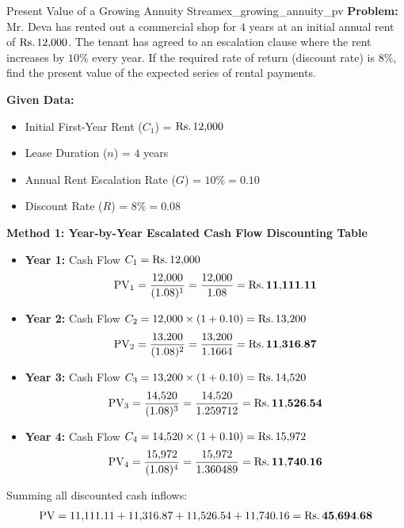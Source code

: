 \begin{example}{Present Value of a Growing Annuity Stream}{ex_growing_annuity_pv}
\textbf{Problem:}
Mr. Deva has rented out a commercial shop for $4$ years at an initial annual rent of $\text{Rs.}\, 12{,}000$. The tenant has agreed to an escalation clause where the rent increases by $10\%$ every year. If the required rate of return (discount rate) is $8\%$, find the present value of the expected series of rental payments.

\tcbline
\textbf{Given Data:}
\begin{itemize}[noitemsep]
    \item Initial First-Year Rent ($C_1$) = $\text{Rs.}\, 12{,}000$
    \item Lease Duration ($n$) = $4$ years
    \item Annual Rent Escalation Rate ($G$) = $10\% = 0.10$
    \item Discount Rate ($R$) = $8\% = 0.08$
\end{itemize}

\textbf{Method 1: Year-by-Year Escalated Cash Flow Discounting Table}
\begin{itemize}[leftmargin=*]
    \item \textbf{Year 1:} Cash Flow $C_1 = \text{Rs.}\, 12{,}000$
    \begin{equation*}
        \operatorname{PV}_1 = \frac{12{,}000}{(1.08)^1} = \frac{12{,}000}{1.08} = \mathbf{\text{Rs.}\, 11{,}111.11}
    \end{equation*}

    \item \textbf{Year 2:} Cash Flow $C_2 = 12{,}000 \times (1 + 0.10) = \text{Rs.}\, 13{,}200$
    \begin{equation*}
        \operatorname{PV}_2 = \frac{13{,}200}{(1.08)^2} = \frac{13{,}200}{1.1664} = \mathbf{\text{Rs.}\, 11{,}316.87}
    \end{equation*}

    \item \textbf{Year 3:} Cash Flow $C_3 = 13{,}200 \times (1 + 0.10) = \text{Rs.}\, 14{,}520$
    \begin{equation*}
        \operatorname{PV}_3 = \frac{14{,}520}{(1.08)^3} = \frac{14{,}520}{1.259712} = \mathbf{\text{Rs.}\, 11{,}526.54}
    \end{equation*}

    \item \textbf{Year 4:} Cash Flow $C_4 = 14{,}520 \times (1 + 0.10) = \text{Rs.}\, 15{,}972$
    \begin{equation*}
        \operatorname{PV}_4 = \frac{15{,}972}{(1.08)^4} = \frac{15{,}972}{1.360489} = \mathbf{\text{Rs.}\, 11{,}740.16}
    \end{equation*}
\end{itemize}
Summing all discounted cash inflows:
\begin{equation*}
    \operatorname{PV} = 11{,}111.11 + 11{,}316.87 + 11{,}526.54 + 11{,}740.16 = \mathbf{\text{Rs.}\, 45{,}694.68}
\end{equation*}


\end{example}
